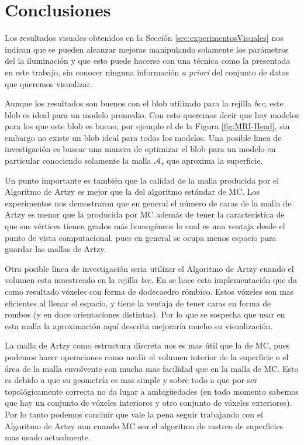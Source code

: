 \chapter*{Conclusiones}

Los resultados visuales obtenidos en la Sección \ref{sec:experimentosVisuales} nos indican que se pueden alcanzar mejoras manipulando solamente los parámetros del la iluminación y que esto puede hacerse con una técnica como la presentada en este trabajo, sin conocer ninguna información \emph{a priori} del conjunto de datos que queremos visualizar.

Aunque los resultados son buenos con el blob utilizado para la rejilla \emph{bcc}, este blob es ideal para un modelo promedio. Con esto queremos decir que hay modelos para los que este blob es bueno, por ejemplo el de la Figura \ref{fig:MRI-Head}, sin embargo no existe un blob ideal para todos los modelos. Una posible linea de investigación es buscar una manera de optimizar el blob para un modelo en particular conociendo solamente la malla $\mathcal{A}_{\tau}$ que aproxima la superficie.

Un punto importante es también que la calidad de la malla producida por el Algoritmo de Artzy es mejor que la del algoritmo estándar de MC. Los experimentos nos demostraron que en general el número de caras de la malla de Artzy es menor que la producida por MC además de tener la característica de que sus vértices tienen grados más homogéneos lo cual es una ventaja desde el punto de vista computacional, pues en general se ocupa menos espacio para guardar las mallas de Artzy.

Otra posible linea de investigación seria utilizar el Algoritmo de Artzy cuando el volumen esta muestreado en la rejilla \emph{bcc}. En \cite{EdgarBoundaryTraking} se hace esta implementación que da como resultado vóxeles con forma de dodecaedro rómbico. Estos vóxeles son mas eficientes al llenar el espacio, y tiene la ventaja de tener caras en forma de rombos (y en doce orientaciones distintas). Por lo que se sospecha que usar en esta malla la aproximación aquí descrita mejoraría mucho su visualización.

La malla de Artzy como estructura discreta nos es mas útil que la de MC, pues podemos hacer operaciones como medir el volumen interior de la superficie o el área de la malla envolvente con mucha mas facilidad que en la malla de MC. Esto es debido a que su geometría es mas simple y sobre todo a que por ser topológicamente correcta no da lugar a ambigüedades (en todo momento sabemos que hay un conjunto de vóxeles interiores y otro conjunto de vóxeles exteriores). Por lo tanto podemos concluir que vale la pena seguir trabajando con el Algoritmo de Artzy aun cuando MC sea el algoritmo de rastreo de superficies mas usado actualmente.

